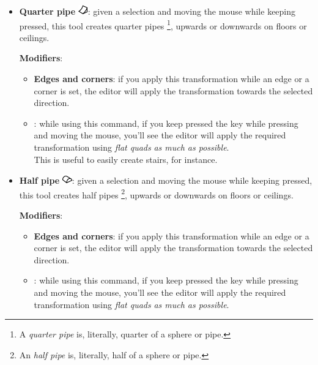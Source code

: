 \begin{itemize}
    \item \textbf{Quarter pipe} \includegraphics[scale=0.5]{Resources/icons_toolbox/toolbox_GroupQuaterPipe-16.png}: given a selection and moving the mouse while keeping  pressed, this tool creates quarter pipes \footnote{A \emph{quarter pipe} is, literally, quarter of a sphere or pipe.}, upwards or downwards on floors or ceilings.
    \par \textbf{Modifiers}:
    \begin{itemize}
        \item \textbf{Edges and corners}: if you apply this transformation while an edge or a corner is set, the editor will apply the transformation towards the selected direction.
        \item \keys{\Alt}: while using this command, if you keep pressed the \keys{\Alt} key while pressing  and moving the mouse, you'll see the editor will apply the required transformation using \emph{flat quads} \emph{as much as possible}. \\ This is useful to easily create stairs, for instance. 
    \end{itemize}

    \item \textbf{Half pipe} \includegraphics[scale=0.5]{Resources/icons_toolbox/toolbox_GroupHalfPipe-16.png}: given a selection and moving the mouse while keeping  pressed, this tool creates half pipes \footnote{An \emph{half pipe} is, literally, half of a sphere or pipe.}, upwards or downwards on floors or ceilings.
    \par \textbf{Modifiers}:
    \begin{itemize}
        \item \textbf{Edges and corners}: if you apply this transformation while an edge or a corner is set, the editor will apply the transformation towards the selected direction.
        \item \keys{\Alt}: while using this command, if you keep pressed the \keys{\Alt} key while pressing  and moving the mouse, you'll see the editor will apply the required transformation using \emph{flat quads} \emph{as much as possible}.
    \end{itemize}


\end{itemize}
